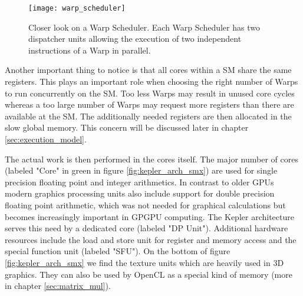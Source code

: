 \begin{figure}
\centering
\texttt{[image: warp\_scheduler]}
\caption{Closer look on a Warp Scheduler. Each Warp Scheduler has two dispatcher units allowing the execution of two independent instructions of a Warp in parallel.}
\label{fig:warp_scheduler}
\end{figure}

Another important thing to notice is that all cores within a SM share the same registers. This plays an important role when choosing the right number of Warps to run concurrently on the SM. Too less Warps may result in unused core cycles whereas a too large number of Warps may request more registers than there are available at the SM. The additionally needed registers are then allocated in the slow global memory. This concern will be discussed later in chapter \ref{sec:execution_model}.

The actual work is then performed in the cores itself. The major number of cores (labeled "Core" in green in figure \ref{fig:kepler_arch_smx}) are used for single precision floating point and integer arithmetics. In contrast to older GPUs modern graphics processing units also include support for double precision floating point arithmetic, which was not needed for graphical calculations but becomes increasingly important in GPGPU computing. The Kepler architecture serves this need by a dedicated core (labeled "DP Unit"). Additional hardware resources include the load and store unit for register and memory access and the special function unit (labeled "SFU"). On the bottom of figure \ref{fig:kepler_arch_smx} we find the texture units which are heavily used in 3D graphics. They can also be used by OpenCL as a special kind of memory (more in chapter \ref{sec:matrix_mul}).

